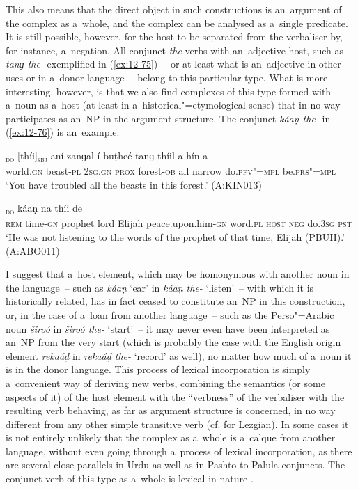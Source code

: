 This also means that the direct object in such constructions is an~argument of the complex as a~whole, and the complex can be analysed as a~single predicate. It is still possible, however, for the host to be separated from the verbaliser by, for instance, a~negation. All conjunct \textit{the}-verbs with an~adjective host, such as \textit{tanɡ the-} exemplified in (\ref{ex:12-75})~-- or at least what is an~adjective in other uses or in a~donor language~-- belong to this particular type. What is more interesting, however, is that we also find complexes of this type formed with a~noun as a~host (at least in a~historical"=etymological sense) that in no way participates as an~NP in the argument structure. The conjunct \textit{káaṇ the-} in (\ref{ex:12-76}) is an~example. 

\begin{exe}
\ex
\label{ex:12-75}
\textsubscript{\textsc{do}} [thíi]\textsubscript{\textsc{sbj}} aní zanɡal-í buṭheé tanɡ thíil-a hín-a \\
world.\textsc{gn} beast-\textsc{pl} \textsc{2sg.gn} \textsc{prox} forest-\textsc{ob} all  narrow do.\textsc{pfv"=mpl} be.\textsc{prs"=mpl} \\
\glt `You have troubled all the beasts in this forest.' (A:KIN013)

\ex
\label{ex:12-76}
\textsubscript{\textsc{do}} káaṇ na thíi de \\
\textsc{rem} time-\textsc{gn} prophet lord Elijah peace.upon.him-\textsc{gn} word.\textsc{pl} \textsc{host} \textsc{neg} do.\textsc{3sg} \textsc{pst} \\
\glt `He was not listening to the words of the prophet of that time, Elijah (PBUH).' (A:ABO011)
\end{exe}

I suggest that a~host element, which may be homonymous with another noun in the language~-- such as \textit{káaṇ} `ear' in \textit{káaṇ the-} `listen'~-- with which it is historically related, has in fact ceased to constitute an~NP in this construction, or, in the case of a~loan from another language~-- such as the Perso"=Arabic noun \textit{široó} in \textit{široó the-} `start'~-- it may never even have been interpreted as an~NP from the very start (which is probably the case with the English origin element \textit{rekaáḍ} in \textit{rekaáḍ the-} `record' as well), no matter how much of a~noun it is in the donor language. This process of lexical incorporation \citep[203]{verma1993} is simply a~convenient way of deriving new verbs, combining the semantics (or some aspects of it) of the host element with the ``verbness'' of the verbaliser with the resulting verb behaving, as far as argument structure is concerned, in no way different from any other simple transitive verb (cf. \citealt[286]{haspelmath1993} for Lezgian). In some cases it is not entirely unlikely that the complex as a~whole is a~calque from another language, without even going through a~process of lexical incorporation, as there are several close parallels in Urdu as well as in Pashto to Palula conjuncts. The conjunct verb of this type as a~whole is lexical in nature \citep[199]{verma1993}.



